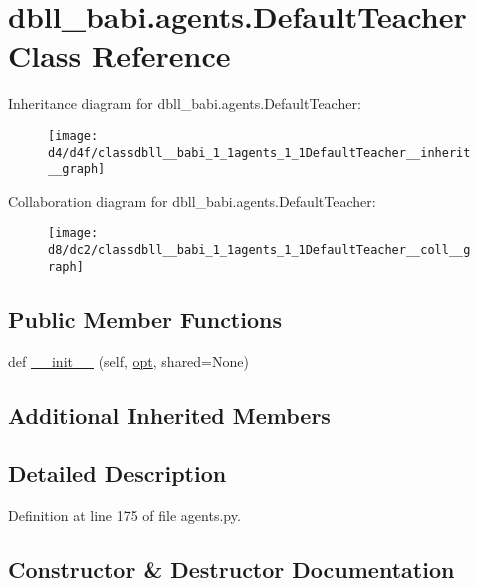 \hypertarget{classdbll__babi_1_1agents_1_1DefaultTeacher}{}\section{dbll\+\_\+babi.\+agents.\+Default\+Teacher Class Reference}
\label{classdbll__babi_1_1agents_1_1DefaultTeacher}


Inheritance diagram for dbll\+\_\+babi.\+agents.\+Default\+Teacher\+:
\nopagebreak
\begin{figure}[H]
\begin{center}
\leavevmode
\texttt{[image: d4/d4f/classdbll\_\_babi\_1\_1agents\_1\_1DefaultTeacher\_\_inherit\_\_graph]}
\end{center}
\end{figure}


Collaboration diagram for dbll\+\_\+babi.\+agents.\+Default\+Teacher\+:
\nopagebreak
\begin{figure}[H]
\begin{center}
\leavevmode
\texttt{[image: d8/dc2/classdbll\_\_babi\_1\_1agents\_1\_1DefaultTeacher\_\_coll\_\_graph]}
\end{center}
\end{figure}
\subsection*{Public Member Functions}
\begin{DoxyCompactItemize}
\item 
def \hyperlink{classdbll__babi_1_1agents_1_1DefaultTeacher_a85fccd548f577a173a3497a5bd6d0e53}{\+\_\+\+\_\+init\+\_\+\+\_\+} (self, \hyperlink{classparlai_1_1core_1_1teachers_1_1FbDialogTeacher_af7a9ec497b9cd0292d7b8fa220da7c28}{opt}, shared=None)
\end{DoxyCompactItemize}
\subsection*{Additional Inherited Members}


\subsection{Detailed Description}


Definition at line 175 of file agents.\+py.



\subsection{Constructor \& Destructor Documentation}
\mbox{\label{classdbll__babi_1_1agents_1_1DefaultTeacher_a85fccd548f577a173a3497a5bd6d0e53}} 

